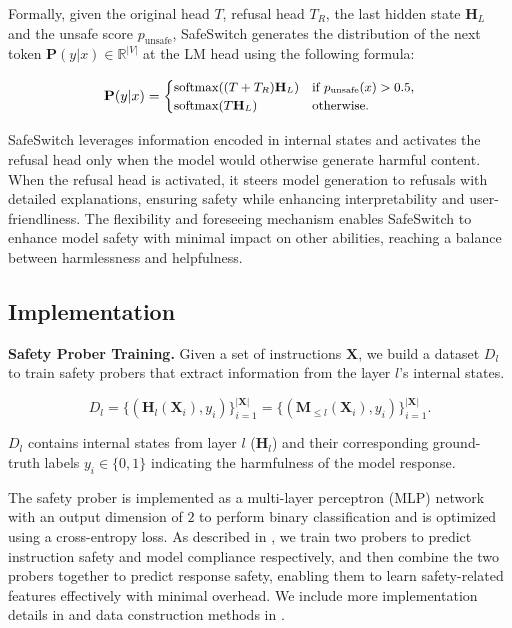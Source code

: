 Formally, given the original head $T$, refusal head $T_R$, the last hidden state $\mathbf{H}_L$ and the unsafe score $p_{\text{unsafe}}$, SafeSwitch generates the distribution of the next token $\mathbf{P}(y|x)\in \mathbb{R}^{|V|}$ at the LM head using the following formula:

\begin{equation}
\small \mathbf{P}(y|x) = 
\begin{cases} 
\text{softmax}((T+T_R)\mathbf{H}_L) & \text{if } p_{\text{unsafe}}(x)>0.5,\\
\text{softmax}(T\mathbf{H}_L) & \text{otherwise}.
\end{cases}
\end{equation}

SafeSwitch leverages information encoded in internal states and activates the refusal head only when the model would otherwise generate harmful content. When the refusal head is activated, it steers model generation to refusals with detailed explanations, ensuring safety while enhancing interpretability and user-friendliness. The flexibility and foreseeing mechanism enables SafeSwitch to enhance model safety with minimal impact on other abilities, reaching a balance between harmlessness and helpfulness.



\subsection{Implementation}
\textbf{Safety Prober Training.} Given a set of instructions $\mathbf{X}$, we build a dataset $D_l$ to train safety probers that extract information from the layer $l$'s internal states.

\[
D_l = \{(\mathbf{H}_{l}(\mathbf{X}_i), y_i)\}_{i=1}^{|\mathbf{X}|} = \{(\mathbf{M}_{\leq l}(\mathbf{X}_i), y_i)\}_{i=1}^{|\mathbf{X}|}.
\]

$D_l$ contains internal states from layer $l$ ($\mathbf{H}_{l}$) and their corresponding ground-truth labels $y_i \in \{0,1\}$ indicating the harmfulness of the model response.


The safety prober is implemented as a multi-layer perceptron (MLP) network with an output dimension of $2$ to perform binary classification and is optimized using a cross-entropy loss. As described in , we train two probers to predict instruction safety and model compliance respectively, and then combine the two probers together to predict response safety, enabling them to learn safety-related features effectively with minimal overhead. We include more implementation details in  and data construction methods in .

